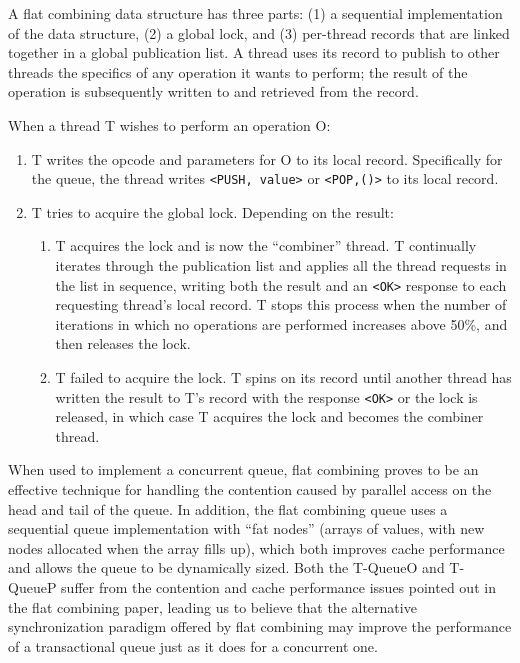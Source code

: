 A flat combining data structure has three parts: (1) a sequential implementation of the data structure, (2) a global lock, and (3) per-thread records that are linked together in a global publication list. A thread uses its record to publish to other threads the specifics of any operation it wants to perform; the result of the operation is subsequently written to and retrieved from the record.

When a thread T wishes to perform an operation O:
\begin{enumerate}
    \item T writes the opcode and parameters for O to its local record. Specifically for the queue, the thread writes \texttt{<PUSH, value>} or \texttt{<POP,()>} to its local record.
   \item T tries to acquire the global lock. Depending on the result:
   \begin{enumerate}
       \item T acquires the lock and is now the “combiner” thread. T continually iterates through the publication list and applies all the thread requests in the list in sequence, writing both the result and an \texttt{<OK>} response to each requesting thread's local record. T stops this process when the number of iterations in which no operations are performed increases above 50\%, and then releases the lock.
        \item T failed to acquire the lock. T spins on its record until another thread has written the result to T's record with the response \texttt{<OK>} or the lock is released, in which case T acquires the lock and becomes the combiner thread. 
    \end{enumerate}
\end{enumerate}

When used to implement a concurrent queue, flat combining proves to be an effective technique for handling the contention caused by parallel access on the head and tail of the queue. In addition, the flat combining queue uses a sequential queue implementation with ``fat nodes'' (arrays of values, with new nodes allocated when the array fills up), which both improves cache performance and allows the queue to be dynamically sized. Both the T-QueueO and T-QueueP suffer from the contention and cache performance issues pointed out in the flat combining paper, leading us to believe that the alternative synchronization paradigm offered by flat combining may improve the performance of a transactional queue just as it does for a concurrent one.

